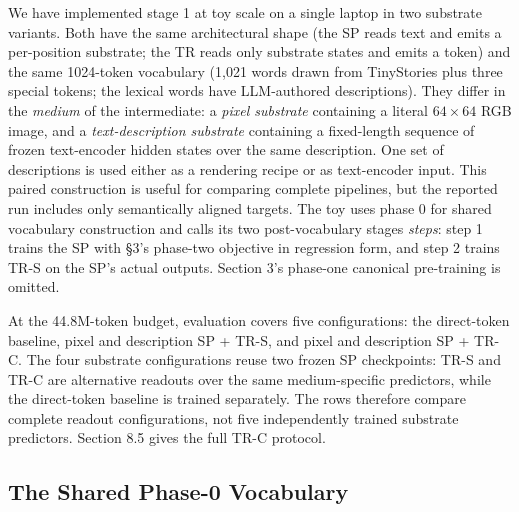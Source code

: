 \documentclass[11pt,a4paper]{article}
\begin{document}
We have implemented stage 1 at toy scale on a single laptop in two substrate variants. Both have the same architectural shape (the SP reads text and emits a per-position substrate; the TR reads only substrate states and emits a token) and the same 1024-token vocabulary (1,021 words drawn from TinyStories plus three special tokens; the lexical words have LLM-authored descriptions). They differ in the \emph{medium} of the intermediate: a \emph{pixel substrate} containing a literal $64{\times}64$ RGB image, and a \emph{text-description substrate} containing a fixed-length sequence of frozen text-encoder hidden states over the same description. One set of descriptions is used either as a rendering recipe or as text-encoder input. This paired construction is useful for comparing complete pipelines, but the reported run includes only semantically aligned targets. The toy uses phase 0 for shared vocabulary construction and calls its two post-vocabulary stages \emph{steps}: step 1 trains the SP with §3's phase-two objective in regression form, and step 2 trains TR-S on the SP's actual outputs. Section 3's phase-one canonical pre-training is omitted.

At the 44.8M-token budget, evaluation covers five configurations: the direct-token baseline, pixel and description SP + TR-S, and pixel and description SP + TR-C. The four substrate configurations reuse two frozen SP checkpoints: TR-S and TR-C are alternative readouts over the same medium-specific predictors, while the direct-token baseline is trained separately. The rows therefore compare complete readout configurations, not five independently trained substrate predictors. Section 8.5 gives the full TR-C protocol.

\subsection{The Shared Phase-0 Vocabulary}
\end{document}
